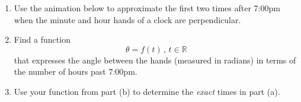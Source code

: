 \documentclass{ximera}
\begin{document}
\begin{question} \label{Qdgbhyy7777}
\begin{enumerate} 
\item Use the animation below to approximate the first two times after 7:00pm when the minute and hour hands of a clock are perpendicular.

\item Find a function 
\[
  \theta = f(t) \, , \, t\in \mathbb{R}
\]
that expresses the angle between the hands (measured in radians) in terms of the number of hours past 7:00pm.

\item Use your function from part (b) to determine the \emph{exact} times in part (a).
\end{enumerate}

\end{question}
\end{document}
